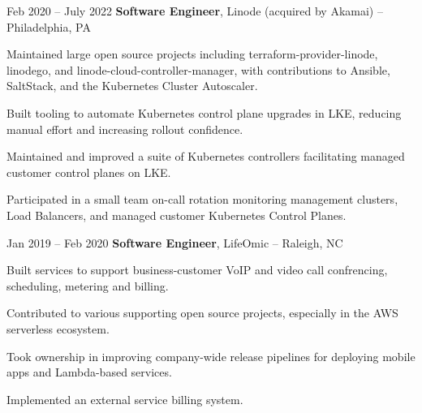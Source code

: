 \begin{twocolentry}{
		Feb 2020 – July 2022
	}
    \textbf{Software Engineer}, Linode (acquired by Akamai) -- Philadelphia, PA\end{twocolentry}

\vspace{0.10 cm}
\begin{onecolentry}
	\begin{highlights}
		\item Maintained large open source projects including terraform-provider-linode, linodego, and linode-cloud-controller-manager, with contributions to Ansible, SaltStack, and the Kubernetes Cluster Autoscaler.
		\item Built tooling to automate Kubernetes control plane upgrades in LKE, reducing manual effort and increasing rollout confidence.
        \item Maintained and improved a suite of Kubernetes controllers facilitating managed customer control planes on LKE.
		\item Participated in a small team on-call rotation monitoring management clusters, Load Balancers, and managed customer Kubernetes Control Planes.
	\end{highlights}
\end{onecolentry}

\vspace{0.2 cm}

\begin{twocolentry}{
		Jan 2019 – Feb 2020
	}
    \textbf{Software Engineer}, LifeOmic -- Raleigh, NC\end{twocolentry}

\vspace{0.10 cm}
\begin{onecolentry}
	\begin{highlights}
		\item Built services to support business-customer VoIP and video call confrencing, scheduling, metering and billing.
		\item Contributed to various supporting open source projects, especially in the AWS serverless ecosystem.
        \item Took ownership in improving company-wide release pipelines for deploying mobile apps and Lambda-based
services.
        \item Implemented an external service billing system.
	\end{highlights}
\end{onecolentry}

